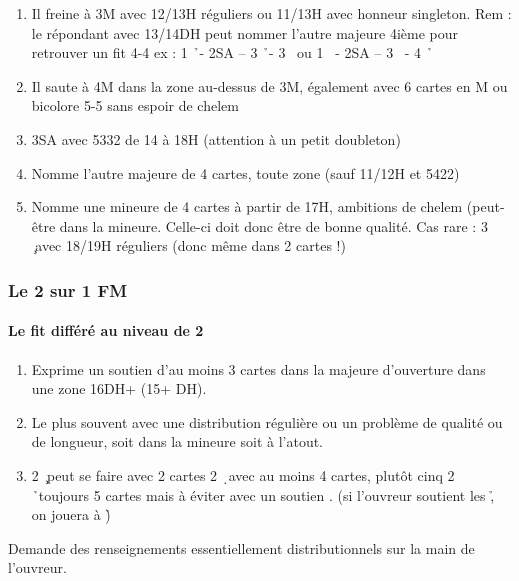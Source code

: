 \documentclass[a4paper]{article}
\begin{document}
\begin{enumerate}
\item Il freine à 3M avec 12/13H réguliers ou 11/13H avec honneur singleton.
Rem : le répondant avec 13/14DH peut nommer l’autre majeure 4ième pour retrouver un fit 4-4
 ex : 1 \h\ - 2SA – 3 \h\ - 3 \s\ ou 1 \s\ - 2SA – 3 \s\ - 4 \h\ 

\item Il saute à 4M dans la zone au-dessus de 3M, également avec 6 cartes en M ou bicolore 5-5 sans 
espoir de chelem

\item 3SA avec 5332 de 14 à 18H (attention à un petit doubleton) 

\item Nomme l’autre majeure de 4 cartes, toute zone (sauf 11/12H et 5422)

\item Nomme une mineure de 4 cartes à partir de 17H, ambitions de chelem (peut-être dans la 
mineure. Celle-ci doit donc être de bonne qualité.
Cas rare : 3 \c\ avec 18/19H réguliers (donc même dans 2 cartes !)

\end{enumerate}

\subsubsection{Le 2 sur 1 FM}

\paragraph{Le fit différé au niveau de 2}

\begin{enumerate}
\item Exprime un soutien d’au moins 3 cartes dans la majeure 
d’ouverture dans une zone 16DH+ (15+
DH).

\item Le plus souvent avec une distribution régulière ou un 
problème de qualité ou de longueur, soit dans la mineure soit 
à l’atout.

\item 2 \c\ peut se faire avec 2 cartes
2 \d\ avec au moins 4 cartes, plutôt cinq
2 \h\ toujours 5 cartes mais à éviter avec un soutien \s . (si 
l’ouvreur soutient les \h , on jouera à \h )

\end{enumerate}

Demande des renseignements essentiellement distributionnels sur 
la main de l’ouvreur.
\end{document}
